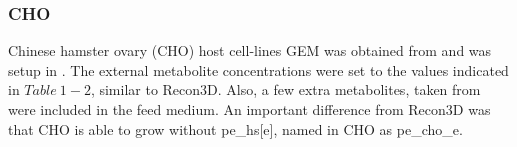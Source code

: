 	\subsubsection{CHO}
	
	Chinese hamster ovary (CHO) host cell-lines GEM was obtained from \cite{Hefzi2016a} and was setup in \cite{Fernandez-de-Cossio-Diaz2018b}.  The external metabolite concentrations were set to the values indicated in $Table\ 1-2$, similar to Recon3D. Also, a few extra metabolites, taken from \cite{Fernandez-de-Cossio-Diaz2018b} were included in the feed medium. An important difference from Recon3D was that CHO is able to grow without pe\_hs[e], named in CHO as pe\_cho\_e. 